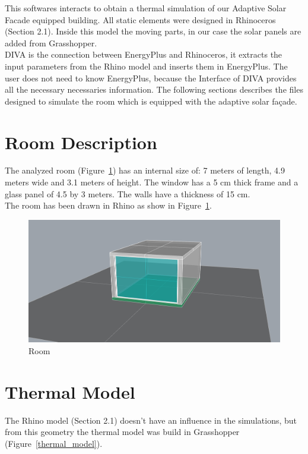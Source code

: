 This softwares interacts to obtain a thermal simulation of our Adaptive Solar Facade equipped building. All static elements were designed in Rhinoceros (Section 2.1). Inside this model the moving parts, in our case the solar panels are added from Grasshopper.\\
DIVA is the connection between EnergyPlus and Rhinoceros, it extracts the input parameters from the Rhino model and inserts them in EnergyPlus. The user does not need to know EnergyPlus, because the Interface of DIVA provides all the necessary necessaries information.
The following sections describes the files designed to simulate the room which is equipped with the adaptive solar fa\c{c}ade.

\section{Room Description}
The analyzed room (Figure~\ref{room}) has an internal size of: 7 meters of length, 4.9 meters wide and 3.1 meters of height. The window has a 5 cm thick frame and a glass panel of 4.5 by 3 meters. The walls have a thickness of 15 cm.\\
The room has been drawn in Rhino as show in Figure~\ref{room}.
\begin{figure}[h]
 \centering
 \includegraphics[width=140mm]{graphic/Room.jpg}
 \caption{Room}
 \label{room}
\end{figure}

\newpage
\section{Thermal Model}
The Rhino model (Section 2.1) doesn't have an influence in the simulations, but from this geometry the thermal model was build in Grasshopper (Figure~\ref{thermal_model}). \\

